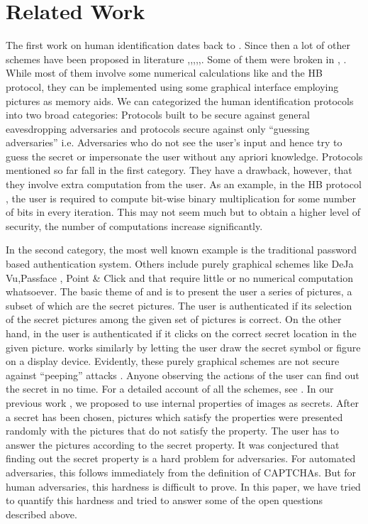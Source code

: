\documentclass{llncs}
\begin{document}
\section{Related Work}
The first work on human identification dates back to \cite{mat:ima}. Since then a lot of other schemes have been proposed in literature \cite{wang},\cite{mat},\cite{xiang},\cite{hopper},\cite{shuj},\cite{wein}. Some of them were broken in \cite{wang}, \cite{goll}. While most of them involve some numerical calculations like \cite{mat:ima} and the HB protocol\cite{hopper}, they can be implemented using some graphical interface employing pictures as memory aids. We can categorized the human identification protocols into two broad categories: Protocols built to be secure against general eavesdropping adversaries and protocols secure against only ``guessing adversaries'' i.e. Adversaries who do not see the user's input and hence try to guess the secret or impersonate the user without any apriori knowledge. Protocols mentioned so far fall in the first category. They have a drawback, however, that they involve extra computation from the user. As an example, in the HB protocol \cite{hopper}, the user is required to compute bit-wise binary multiplication for some number of bits in every iteration. This may not seem much but to obtain a higher level of security, the number of computations increase significantly.

In the second category, the most well known example is the traditional password based authentication system. Others include purely graphical schemes like DeJa Vu\cite{dham},Passface \cite{passf}, Point \& Click \cite{passp} and \cite{grap} that require little or no numerical computation whatsoever. The basic theme of \cite{dham} and \cite{passf} is to present the user a series of pictures, a subset of which are the secret pictures. The user is authenticated if its selection of the secret pictures among the given set of pictures is correct. On the other hand, in \cite{passp} the user is authenticated if it clicks on the correct secret location in the given picture. \cite{grap} works similarly by letting the user draw the secret symbol or figure on a display device. Evidently, these purely graphical schemes are not secure against ``peeping'' attacks \cite{shuj}. Anyone observing the actions of the user can find out the secret in no time. For a detailed account of all the schemes, see \cite{shuj}. In our previous work \cite{hassan}, we proposed to use internal properties of images as secrets. After a secret has been chosen, pictures which satisfy the properties were presented randomly with the pictures that do not satisfy the property. The user has to answer the pictures according to the secret property. It was conjectured that finding out the secret property is a hard problem for adversaries. For automated adversaries, this follows immediately from the definition of CAPTCHAs\cite{luis}. But for human adversaries, this hardness is difficult to prove. In this paper, we have tried to quantify this hardness and tried to answer some of the open questions described above. 
\end{document}
